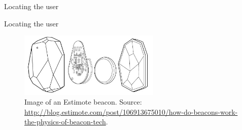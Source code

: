 \begin{frame}{Locating the user}{}
\centering
\begin{figure}[!htb]%
\label{fig:prototype3-room-screenshot}
\end{figure}
\end{frame}

\begin{frame}{Locating the user}{}
\begin{figure}[!htb]
  \includegraphics[width=0.6\textwidth]{../images/estimotebeacon}
  \caption{Image of an Estimote beacon. Source: \protect\url{http://blog.estimote.com/post/106913675010/how-do-beacons-work-the-physics-of-beacon-tech}.}
  \label{fig:estimotebeacon}
\end{figure}
\end{frame}